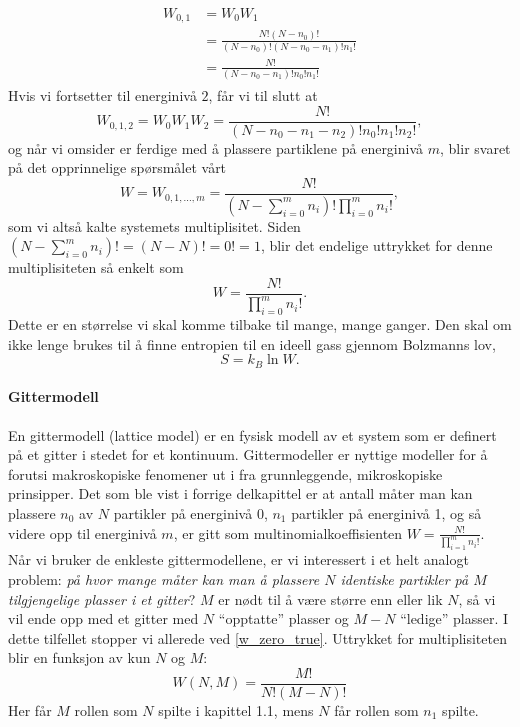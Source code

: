 \begin{align}
\begin{split}
	W_{0,1} &= W_0W_1 \\
	&= \frac{N!(N-n_0)!}{(N-n_0)!(N-n_0-n_1)!n_1!}\\
	&= \frac{N!}{(N-n_0-n_1)!n_0!n_1!}
\end{split}
\end{align}
Hvis vi fortsetter til energinivå $2$, får vi til slutt at 
\begin{equation}
	W_{0,1,2} = W_0W_1W_2 = \frac{N!}{(N-n_0-n_1-n_2)!n_0!n_1!n_2!},
\end{equation}
og når vi omsider er ferdige med å plassere partiklene på energinivå $m$, blir svaret på det opprinnelige spørsmålet vårt
\begin{equation}
	W=W_{0,1,...,m} = \frac{N!}{(N-\sum_{i=0}^m n_i)!\prod_{i=0}^m n_i!},
\end{equation}
som vi altså kalte systemets multiplisitet. Siden $\left(N-\sum_{i=0}^m n_i\right)! = (N-N)!=0!=1$, blir det endelige uttrykket for denne multiplisiteten så enkelt som
\begin{equation}
	W=\frac{N!}{\prod_{i=0}^m n_i!}.
\end{equation}
Dette er en størrelse vi skal komme tilbake til mange, mange ganger. Den skal om ikke lenge brukes til å finne entropien til en ideell gass gjennom Bolzmanns lov, 
\begin{equation}
	\label{bolzmannearly}
	S=k_B\ln W.
\end{equation}

\paragraph{Gittermodell} En gittermodell (lattice model) er en fysisk modell av et system som er definert på et gitter i stedet for et kontinuum. Gittermodeller er nyttige modeller for å forutsi makroskopiske fenomener ut i fra grunnleggende, mikroskopiske prinsipper.
Det som ble vist i forrige delkapittel er at antall måter man kan plassere $n_0$ av $N$ partikler på energinivå 0, $n_1$ partikler på energinivå 1, og så videre opp til energinivå $m$, er gitt som multinomialkoeffisienten $W = \frac{N!}{\prod_{i=1}^m n_i!}$.
Når vi bruker de enkleste gittermodellene, er vi interessert i et helt analogt problem: \emph{på hvor mange måter kan man å plassere $N$ identiske partikler på $M$ tilgjengelige plasser i et gitter}? $M$ er nødt til å være større enn eller lik $N$, så vi vil ende opp med et gitter med $N$ ``opptatte'' plasser og $M-N$ ``ledige'' plasser. I dette tilfellet stopper vi allerede ved \eqref{w_zero_true}. Uttrykket for multiplisiteten blir en funksjon av kun $N$ og $M$:
\begin{equation}
	\label{latticemultiplicity}
	W(N,M)=\frac{M!}{N!(M-N)!}
\end{equation}
Her får $M$ rollen som $N$ spilte i kapittel 1.1, mens $N$ får rollen som $n_1$ spilte.

